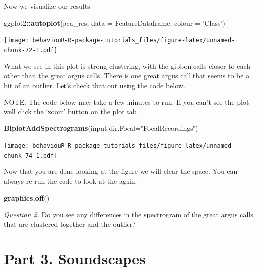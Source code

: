 \documentclass[]{book}
\newenvironment{Shaded}{\begin{snugshade}}{\end{snugshade}}
\newcommand{\DataTypeTok}[1]{\textcolor[rgb]{0.13,0.29,0.53}{#1}}
\newcommand{\KeywordTok}[1]{\textcolor[rgb]{0.13,0.29,0.53}{\textbf{#1}}}
\newcommand{\NormalTok}[1]{#1}
\newcommand{\OperatorTok}[1]{\textcolor[rgb]{0.81,0.36,0.00}{\textbf{#1}}}
\newcommand{\StringTok}[1]{\textcolor[rgb]{0.31,0.60,0.02}{#1}}
\begin{document}
Now we visualize our results

\begin{Shaded}
\begin{Highlighting}[]
\NormalTok{ggplot2}\OperatorTok{::}\KeywordTok{autoplot}\NormalTok{(pca_res, }\DataTypeTok{data =}\NormalTok{ FeatureDataframe, }
         \DataTypeTok{colour =} \StringTok{'Class'}\NormalTok{)}
\end{Highlighting}
\end{Shaded}

\texttt{[image: behaviouR-R-package-tutorials\_files/figure-latex/unnamed-chunk-72-1.pdf]}

What we see in this plot is strong clustering, with the gibbon calls closer to each other than the great argus calls. There is one great argus call that seems to be a bit of an outlier. Let's check that out using the code below.

NOTE: The code below may take a few minutes to run. If you can't see the plot well click the `zoom' button on the plot tab

\begin{Shaded}
\begin{Highlighting}[]
\KeywordTok{BiplotAddSpectrograms}\NormalTok{(}\DataTypeTok{input.dir.Focal=}\StringTok{"FocalRecordings"}\NormalTok{)}
\end{Highlighting}
\end{Shaded}

\texttt{[image: behaviouR-R-package-tutorials\_files/figure-latex/unnamed-chunk-74-1.pdf]}

Now that you are done looking at the figure we will clear the space. You can always re-run the code to look at the again.

\begin{Shaded}
\begin{Highlighting}[]
\KeywordTok{graphics.off}\NormalTok{()}
\end{Highlighting}
\end{Shaded}

\emph{Question 2.} Do you see any differences in the spectrogram of the great argus calls that are clustered together and the outlier?

\hypertarget{part-3.-soundscapes}{%
\section*{Part 3. Soundscapes}\label{part-3.-soundscapes}}
\end{document}
